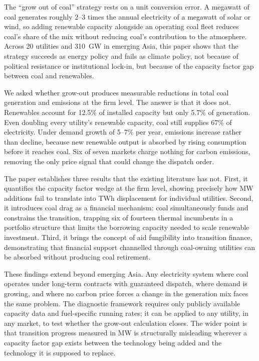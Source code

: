\documentclass[review,3p,authoryear]{elsarticle}
\begin{document}
The ``grow out of coal'' strategy rests on a unit conversion error. A megawatt of coal generates roughly 2--3 times the annual electricity of a megawatt of solar or wind, so adding renewable capacity alongside an operating coal fleet reduces coal's share of the mix without reducing coal's contribution to the atmosphere. Across 20 utilities and 310~GW in emerging Asia, this paper shows that the strategy succeeds as energy policy and fails as climate policy, not because of political resistance or institutional lock-in, but because of the capacity factor gap between coal and renewables.

We asked whether grow-out produces measurable reductions in total coal generation and emissions at the firm level. The answer is that it does not. Renewables account for 12.5\% of installed capacity but only 5.7\% of generation. Even doubling every utility's renewable capacity, coal still supplies 67\% of electricity. Under demand growth of 5--7\% per year, emissions increase rather than decline, because new renewable output is absorbed by rising consumption before it reaches coal. Six of seven markets charge nothing for carbon emissions, removing the only price signal that could change the dispatch order.

The paper establishes three results that the existing literature has not. First, it quantifies the capacity factor wedge at the firm level, showing precisely how MW additions fail to translate into TWh displacement for individual utilities. Second, it introduces coal drag as a financial mechanism: coal simultaneously funds and constrains the transition, trapping six of fourteen thermal incumbents in a portfolio structure that limits the borrowing capacity needed to scale renewable investment. Third, it brings the concept of aid fungibility into transition finance, demonstrating that financial support channelled through coal-owning utilities can be absorbed without producing coal retirement.

These findings extend beyond emerging Asia. Any electricity system where coal operates under long-term contracts with guaranteed dispatch, where demand is growing, and where no carbon price forces a change in the generation mix faces the same problem. The diagnostic framework requires only publicly available capacity data and fuel-specific running rates; it can be applied to any utility, in any market, to test whether the grow-out calculation closes. The wider point is that transition progress measured in MW is structurally misleading wherever a capacity factor gap exists between the technology being added and the technology it is supposed to replace.
\end{document}
